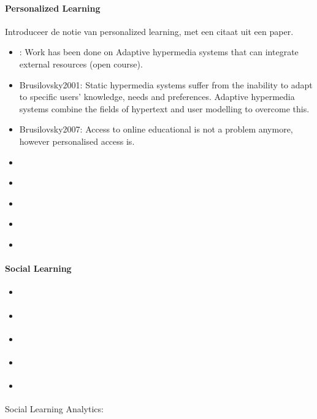 \documentclass[11pt]{article}
\begin{document}
\paragraph{Personalized Learning}
Introduceer de notie van personalized learning, met een citaat uit een paper. 
\begin{itemize}
  \item \cite{Weber2001}: Work has been done on Adaptive hypermedia systems that can integrate external resources (open course).
  \item Brusilovsky2001: Static hypermedia systems suffer from the inability to adapt to specific users' knowledge, needs and preferences. Adaptive hypermedia systems combine the fields of hypertext and user modelling to overcome this.
  \item Brusilovsky2007: Access to online educational is not a problem anymore, however personalised access is.
  \item \cite{Brusilovsky2003}
  \item \cite{Henze2001}
  \item \cite{Farzan2004}
  \item \cite{Tand2005}
  \item \cite{Modritscher2011}
\end{itemize}

\paragraph{Social Learning}
\begin{itemize}
  \item \cite{Shum2011}
  \item \cite{Ullmann2011}
  \item \cite{Haiming2012}
  \item \cite{Fournier2011}
  \item \cite{Ferguson2012b}
\end{itemize}

Social Learning Analytics:


\end{document}
